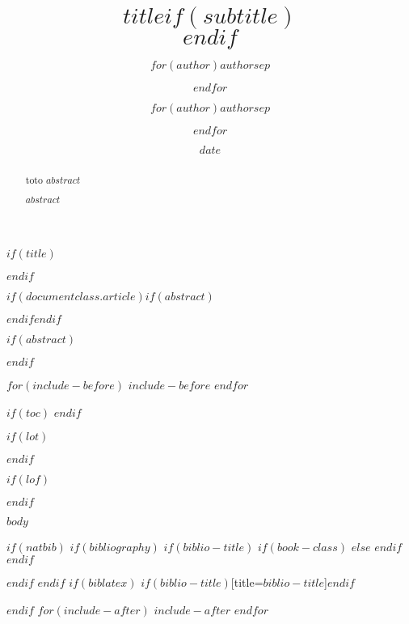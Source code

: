\documentclass[$if(fontsize)$$fontsize$,$endif$$if(lang)$$lang$,$endif$$if(papersize)$$papersize$,$endif$$for(classoption)$$classoption$$sep$,$endfor$]{$documentclass$}
\title{$title$$if(subtitle)$\\\vspace{0.5em}{\large $subtitle$}$endif$}
\author{$for(author)$$author$$sep$ \and $endfor$}
\author[1]{$for(author)$$author$$sep$ \and $endfor$}
\affil[1]{$institute$}
\date{$date$}
\begin{document}
$if(title)$
\maketitle
$endif$

$if(documentclass.article)$$if(abstract)$
\begin{abstract}
  toto
  $abstract$
\end{abstract}
$endif$$endif$

$if(abstract)$
\begin{abstract}
  $abstract$
\end{abstract}
$endif$
  
$for(include-before)$
$include-before$
$endfor$

$if(toc)$
{
  \hypersetup{linkcolor=$if(toccolor)$$toccolor$$else$toc-links$endif$}
  \setcounter{tocdepth}{$toc-depth$}
  \tableofcontents
}
$endif$

$if(lot)$
\listoftables
$endif$

$if(lof)$
\listoffigures
$endif$

$body$

$if(natbib)$
$if(bibliography)$
$if(biblio-title)$
$if(book-class)$
\renewcommand\bibname{$biblio-title$}
$else$
\renewcommand\refname{$biblio-title$}
$endif$
$endif$


$endif$
$endif$
$if(biblatex)$
\printbibliography$if(biblio-title)$[title=$biblio-title$]$endif$

$endif$
$for(include-after)$
$include-after$
$endfor$
\end{document}
